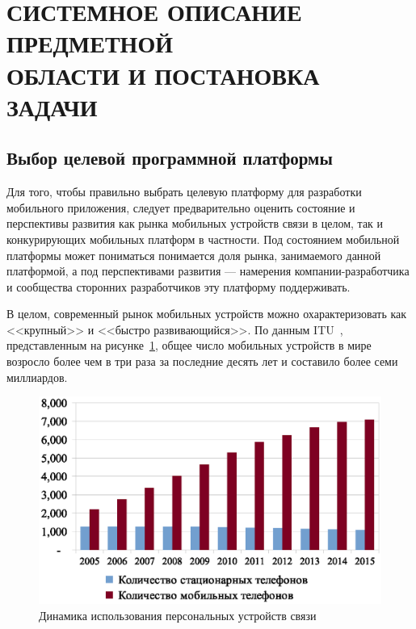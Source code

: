 \section[Системное описание предметной области и постановка задачи]{%
  СИСТЕМНОЕ ОПИСАНИЕ ПРЕДМЕТНОЙ \\
  ОБЛАСТИ И ПОСТАНОВКА ЗАДАЧИ
}\label{sec:system_spec}

\subsection{Выбор целевой программной платформы}

Для того, чтобы правильно выбрать целевую платформу для разработки
мобильного приложения, следует предварительно оценить состояние и
перспективы развития как рынка мобильных устройств связи в целом,
так и конкурирующих мобильных платформ в частности.
Под состоянием мобильной платформы может пониматься понимается
доля рынка, занимаемого данной платформой,
а под перспективами развития --- намерения компании-разработчика и
сообщества сторонних разработчиков эту платформу поддерживать.

В целом, современный рынок мобильных устройств можно охарактеризовать
как <<крупный>> и <<быстро развивающийся>>.
По данным ITU~\cite{itu_stat_phone}, представленным на рисунке~\ref{fig:stat_phone},
общее число мобильных устройств в мире возросло
более чем в три раза за последние десять лет
и составило более семи миллиардов.

\begin{figure}[h!]
  \centering
  \includegraphics[width=150mm]{fig/stat_phone.eps}
  \caption{Динамика использования персональных устройств связи}
  \label{fig:stat_phone}
\end{figure}


